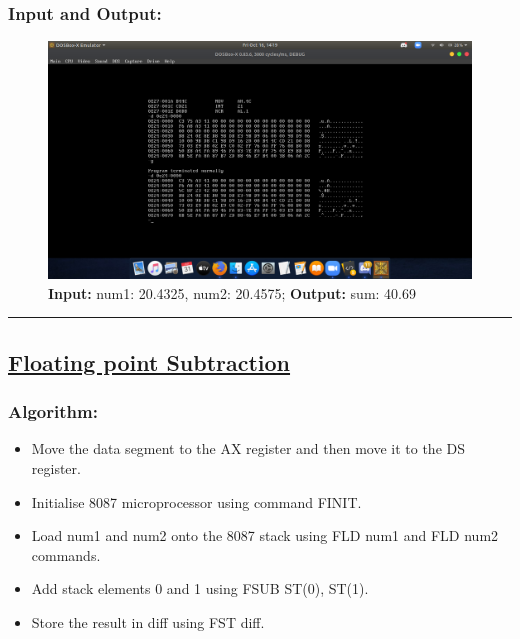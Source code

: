 \documentclass[10pt,a4paper]{article}
\begin{document}
\begin{flushleft}
\subsubsection*{\textbf{Input and Output:}}
\begin{figure}[h]
    \centering
    \includegraphics[trim = 100mm 60mm 100mm 80mm, clip, width = \textwidth]{Pics/FAIO.png}
    \caption{ \textbf{Input:} num1: 20.4325, num2: 20.4575; \newline \hspace{1cm}
              \textbf{Output:} sum: 40.69}
\end{figure}
\hrule
\newpage
\subsection*{\textbf{\underline{Floating point Subtraction}}}

\subsubsection*{\textbf{Algorithm:}}
\begin{itemize}
    \item Move the data segment to the AX register and then move it to the DS register.
    \item Initialise 8087 microprocessor using command FINIT.
    \item Load num1 and num2 onto the 8087 stack using FLD num1 and FLD num2 commands.
    \item Add stack elements 0 and 1 using FSUB ST(0), ST(1).
    \item Store the result in diff using FST diff.
\end{itemize}


\end{flushleft}
\end{document}

